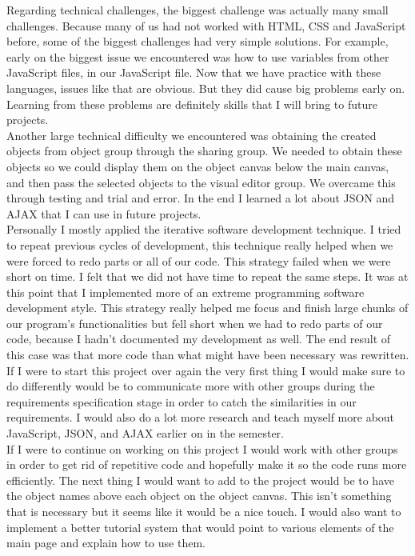 \documentclass[12pt]{article}
\begin{document}
Regarding technical challenges, the biggest challenge was actually many small challenges. Because many of us had not worked with HTML, CSS and JavaScript before, some of the biggest challenges had very simple solutions. For example, early on the biggest issue we encountered was how to use variables from other JavaScript files, in our JavaScript file. Now that we have practice with these languages, issues like that are obvious. But they did cause big problems early on. Learning from these problems are definitely skills that I will bring to future projects. \\

Another large technical difficulty we encountered was obtaining the created objects from object group through the sharing group. We needed to obtain these objects so we could display them on the object canvas below the main canvas, and then pass the selected objects to the visual editor group. We overcame this through testing and trial and error. In the end I learned a lot about JSON and AJAX that I can use in future projects. \\

Personally I mostly applied the iterative software development technique. I tried to repeat previous cycles of development, this technique really helped when we were forced to redo parts or all of our code. This strategy failed when we were short on time. I felt that we did not have time to repeat the same steps. It was at this point that I implemented more of an extreme programming software development style. This strategy really helped me focus and finish large chunks of our program's functionalities but fell short when we had to redo parts of our code, because I hadn't documented my development as well. The end result of this case was that more code than what might have been necessary was rewritten. \\

If I were to start this project over again the very first thing I would make sure to do differently would be to communicate more with other groups during the requirements specification stage in order to catch the similarities in our requirements. I would also do a lot more research and teach myself more about JavaScript, JSON, and AJAX earlier on in the semester. \\

If I were to continue on working on this project I would work with other groups in order to get rid of repetitive code and hopefully make it so the code runs more efficiently. The next thing I would want to add to the project would be to have the object names above each object on the object canvas. This isn't something that is necessary but it seems like it would be a nice touch. I would also want to implement a better tutorial system that would point to various elements of the main page and explain how to use them.
\end{document}
